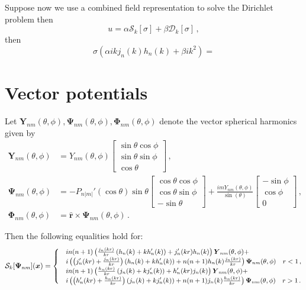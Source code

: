 \documentclass[11pt]{article}
\newcommand\br{\boldsymbol r}
\newcommand\bx{\boldsymbol x}
\newcommand\bY{\boldsymbol Y}
\newcommand\bPhi{\boldsymbol \Phi}
\newcommand\bPsi{\boldsymbol \Psi}
\newcommand\cS{\mathcal{S}}
\newcommand\cD{\mathcal{D}}
\theoremstyle{definition}
\theoremstyle{remark}
\numberwithin{equation}{section}
\begin{document}
Suppose now we use a combined field representation to solve the Dirichlet problem then 
\begin{equation}
u = \alpha \cS_{k}[\sigma] + \beta \cD_{k}[\sigma] \, ,
\end{equation}
then
\begin{equation}
\sigma (\alpha ik j_{n}(k) h_{n}(k) + \beta ik^2 ) = 
\end{equation}

\section*{Vector potentials}
Let $\bY_{nm}(\theta,\phi), \bPsi_{nm}(\theta,\phi), \bPhi_{nm}(\theta,\phi)$ denote the vector spherical harmonics given by
\begin{equation}
\begin{aligned}
\bY_{nm}(\theta,\phi) &= 
Y_{nm}(\theta,\phi)\begin{bmatrix}
\sin{\theta} \cos{\phi} \\
\sin{\theta} \sin{\phi} \\
\cos{\theta} 
\end{bmatrix} \, , \\
\bPsi_{nm}(\theta,\phi) &= 
-P_{n|m|}'(\cos{\theta}) \sin{\theta}\begin{bmatrix}
\cos{\theta} \cos{\phi} \\
\cos{\theta} \sin{\phi} \\
-\sin{\theta} 
\end{bmatrix}
+
\frac{imY_{nm}(\theta,\phi)}{\sin(\theta)}
\begin{bmatrix}
-\sin{\phi} \\
\cos{\phi} \\
0
\end{bmatrix} \, ,\\
\bPhi_{nm}(\theta,\phi) &= \hat{\br} \times \bPsi_{nm}(\theta,\phi) \, .
\end{aligned}
\end{equation} 


 Then the following equalities hold for:
\begin{equation}
\cS_{k}[\bPsi_{nm}](\bx) = 
{\small
\begin{cases}
&i n(n+1) \left( \frac{j_{n}(kr)}{kr} \left( h_{n}(k) + kh_{n}'(k) \right) + j_{n}'(kr) h_{n}(k) \right) \bY_{nm}(\theta,\phi) + \\
& i\left(  \left(j_{n}'(kr) + \frac{j_{n}(kr)}{kr}\right) \left( h_{n}(k) + kh_{n}'(k) \right) + n(n+1)h_{n}(k)\frac{j_{n}(kr)}{kr} \right) \bPsi_{nm}(\theta,\phi) \quad r<1 \, , \\
&i n(n+1) \left( \frac{h_{n}(kr)}{kr} \left( j_{n}(k) + kj_{n}'(k) \right) + h_{n}'(kr) j_{n}(k) \right) \bY_{nm}(\theta,\phi) + \\
& i\left(  \left(h_{n}'(kr) + \frac{h_{n}(kr)}{kr}\right) \left( j_{n}(k) + kj_{n}'(k) \right) + n(n+1)j_{n}(k)\frac{h_{n}(kr)}{kr} \right) \bPsi_{nm}(\theta,\phi) \quad r>1 \, .
\end{cases}}
\end{equation}
\end{document}
